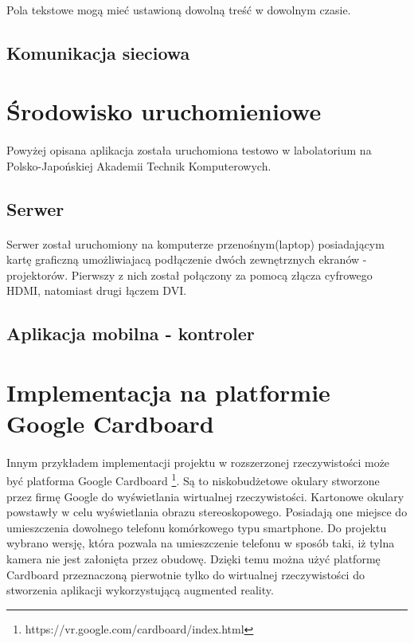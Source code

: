 \documentclass[12pt]{article}
\begin{document}
{{\paragraph{}
Pola tekstowe mogą mieć ustawioną dowolną treść w dowolnym czasie.

\subsection{Komunikacja sieciowa}



\section{Środowisko uruchomieniowe}
\paragraph{}
Powyżej opisana aplikacja została uruchomiona testowo w labolatorium na Polsko-Japońskiej Akademii Technik Komputerowych.

\subsection{Serwer}
\paragraph{}
Serwer został uruchomiony na komputerze przenośnym(laptop) posiadającym kartę graficzną umożliwiajacą podłączenie dwóch zewnętrznych ekranów - projektorów. Pierwszy z nich został połączony za pomocą złącza cyfrowego HDMI, natomiast drugi łączem DVI.
\subsection{Aplikacja mobilna - kontroler}


\newpage
\section{Implementacja na platformie Google Cardboard}
\paragraph{}
Innym przykładem implementacji projektu w rozszerzonej rzeczywistości może być platforma Google Cardboard \footnote{https://vr.google.com/cardboard/index.html}. Są to niskobudżetowe okulary stworzone przez firmę Google do wyświetlania wirtualnej rzeczywistości. Kartonowe okulary powstawły w celu wyświetlania obrazu stereoskopowego. Posiadają one miejsce do umieszczenia dowolnego telefonu komórkowego typu smartphone. Do projektu wybrano wersję, która pozwala na umieszczenie telefonu w sposób taki, iż tylna kamera nie jest załonięta przez obudowę. Dzięki temu można użyć platformę Cardboard przeznaczoną pierwotnie tylko do wirtualnej rzeczywistości do stworzenia aplikacji wykorzystującą augmented reality.

}}
\end{document}
